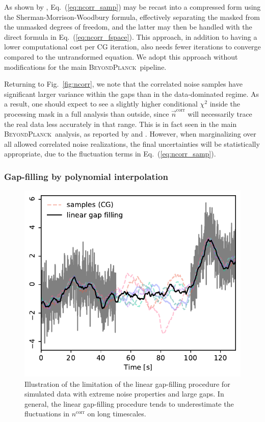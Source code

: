 \documentclass[twocolumn]{aa}
\newcommand{\n}[0]{\vec{n}}
\newcommand{\BP}{\textsc{BeyondPlanck}}
\begin{document}
As shown by \citet{bp02}, Eq.~(\ref{eq:ncorr_samp}) may be recast into
a compressed form using the Sherman-Morrison-Woodbury formula,
effectively separating the masked from the unmasked degrees of
freedom, and the latter may then be handled with the direct formula in
Eq.~(\ref{eq:ncorr_fspace}). This approach, in addition to having a
lower computational cost per CG iteration, also needs fewer iterations
to converge compared to the untransformed equation. We adopt this
approach without modifications for the main \BP\ pipeline. 

Returning to Fig.~\ref{fig:ncorr}, we note that the correlated noise
samples have significant larger variance within the gaps than in the
data-dominated regime. As a result, one should expect to see a
slightly higher conditional $\chi^2$ inside the processing mask in a
full analysis than outside, since $\n^{\mathrm{corr}}$ will
necessarily trace the real data less accurately in that range. This is
in fact seen in the main \BP\ analysis, as reported by
\citet{bp01} and \citet{bp13}. However, when marginalizing over all allowed
correlated noise realizations, the final uncertainties will be
statistically appropriate, due to the fluctuation terms in
Eq.~(\ref{eq:ncorr_samp}).

\subsubsection{Gap-filling by polynomial interpolation}

\begin{figure}
	\begin{center}
		\includegraphics[width=\linewidth]{figs/gap_filling_bias.pdf}
	\end{center}
	\caption{Illustration of the limitation of the linear
          gap-filling procedure for simulated data with extreme noise
          properties and large gaps. In general, the linear
          gap-filling procedure tends to underestimate the
          fluctuations in $n^\mathrm{corr}$ on long timescales.}
	\label{fig:bias}
\end{figure}
\end{document}
